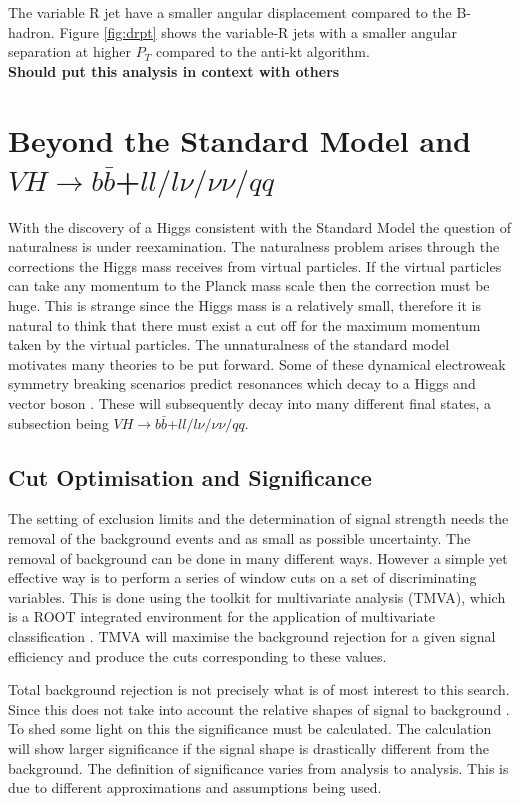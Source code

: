 The variable R jet have a smaller angular displacement compared to the B-hadron. Figure \ref{fig:drpt} shows the variable-R jets with a smaller angular separation at higher $P_T$ compared to the anti-kt algorithm. 
\\
\textbf{Should put this analysis in context with others}
\\
\section{Beyond the Standard Model and $VH\rightarrow b\bar{b}$+$ll/l\nu/\nu\nu/qq$}
\label{resonance}
With the discovery of a Higgs consistent with the Standard Model the question of naturalness is under reexamination\cite{natural}. The naturalness problem arises through the corrections the Higgs mass receives from virtual particles. If the virtual particles can take any momentum to the Planck mass scale then the correction must be huge. This is strange since the Higgs mass is a relatively small, therefore it is natural to think that there must exist a cut off for the maximum momentum taken by the virtual particles.  
 The unnaturalness of the standard model motivates many theories to be put forward. Some of these dynamical electroweak symmetry breaking scenarios predict resonances which decay to a Higgs and vector boson \cite{resonance}. These will subsequently decay into many different final states, a subsection being $VH\rightarrow b\bar{b}$+$ll/l\nu/\nu\nu/qq$.

\subsection{Cut Optimisation and Significance}
\label{Significance}
The setting of exclusion limits and the determination of signal strength needs the removal of the background events and as small as possible uncertainty.
The removal of background can be done in many different ways. However a simple yet effective way is to perform a series of window cuts on a set of discriminating variables.  
This is done using the toolkit for multivariate analysis (TMVA), which is a ROOT integrated environment for the application of multivariate classification \cite{tmva}.
TMVA will maximise the background rejection for a given signal efficiency and produce the cuts corresponding to these values.

Total background rejection is not precisely what is of most interest to this search. Since this does not take into account the relative shapes of signal to background \cite{statphysics}. To shed some light on this the significance must be calculated. The calculation will show larger significance if the signal shape is drastically different from the background. The definition of significance varies from analysis to analysis. This is due to different approximations and assumptions being used. 


